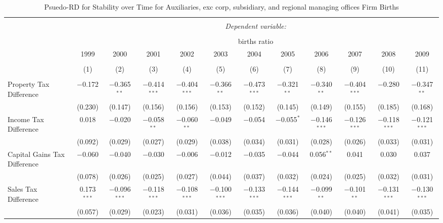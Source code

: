 
\begin{table}[!htbp] \centering 
  \caption{Psuedo-RD for Stability over Time for  Auxiliaries, exc corp, subsidiary, and regional managing offices Firm Births} 
  \label{} 
\begin{tabular}{@{\extracolsep{5pt}}lccccccccccc} 
\\[-1.8ex]\hline 
\hline \\[-1.8ex] 
 & \multicolumn{11}{c}{\textit{Dependent variable:}} \\ 
\cline{2-12} 
\\[-1.8ex] & \multicolumn{11}{c}{births ratio} \\ 
 & 1999 & 2000 & 2001 & 2002 & 2003 & 2004 & 2005 & 2006 & 2007 & 2008 & 2009 \\ 
\\[-1.8ex] & (1) & (2) & (3) & (4) & (5) & (6) & (7) & (8) & (9) & (10) & (11)\\ 
\hline \\[-1.8ex] 
 Property Tax Difference & $-$0.172 & $-$0.365$^{**}$ & $-$0.414$^{***}$ & $-$0.404$^{***}$ & $-$0.366$^{**}$ & $-$0.473$^{***}$ & $-$0.321$^{**}$ & $-$0.340$^{**}$ & $-$0.404$^{***}$ & $-$0.280 & $-$0.347$^{**}$ \\ 
  & (0.230) & (0.147) & (0.156) & (0.156) & (0.153) & (0.152) & (0.145) & (0.149) & (0.155) & (0.185) & (0.168) \\ 
  Income Tax Difference & 0.018 & $-$0.020 & $-$0.058$^{**}$ & $-$0.060$^{**}$ & $-$0.049 & $-$0.054 & $-$0.055$^{*}$ & $-$0.146$^{***}$ & $-$0.126$^{***}$ & $-$0.118$^{***}$ & $-$0.121$^{***}$ \\ 
  & (0.092) & (0.029) & (0.027) & (0.029) & (0.038) & (0.034) & (0.031) & (0.028) & (0.026) & (0.033) & (0.031) \\ 
  Capital Gains Tax Difference & $-$0.060 & $-$0.040 & $-$0.030 & $-$0.006 & $-$0.012 & $-$0.035 & $-$0.044 & 0.056$^{**}$ & 0.041 & 0.030 & 0.037 \\ 
  & (0.078) & (0.026) & (0.025) & (0.027) & (0.044) & (0.037) & (0.032) & (0.024) & (0.025) & (0.032) & (0.031) \\ 
  Sales Tax Difference & 0.173$^{***}$ & $-$0.096$^{***}$ & $-$0.118$^{***}$ & $-$0.108$^{***}$ & $-$0.100$^{***}$ & $-$0.133$^{***}$ & $-$0.144$^{***}$ & $-$0.099$^{**}$ & $-$0.101$^{**}$ & $-$0.131$^{***}$ & $-$0.130$^{***}$ \\ 
  & (0.057) & (0.029) & (0.023) & (0.031) & (0.036) & (0.035) & (0.036) & (0.040) & (0.040) & (0.041) & (0.035) \\ 

\end{tabular}
\end{table}
